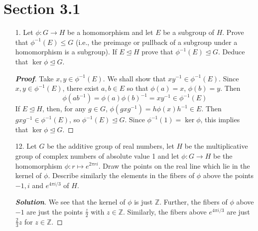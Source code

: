 \documentclass[12pt,leqno]{book}
\theoremstyle{definition}
\newcommand{\Z}{\mathbb{Z}}
\newenvironment{Proof}{\begin{proof}[\textnormal{\textbf{Proof}}]}{\end{proof}}
\newenvironment{Solution}{\begin{proof}[\textnormal{\textbf{Solution}}]}{\end{proof}}
\begin{document}
\section*{Section 3.1}
\begin{enumerate}
 \item [1.] Let $\phi:G\to H$ be a homomorphism and let $E$ be a subgroup of $H$. Prove that $\phi^{-1}(E)\leq G$ (i.e., the preimage or pullback of a subgroup under a homomorphism is a subgroup). If $E\unlhd H$ prove that $\phi^{-1}(E)\unlhd G$. Deduce that $\ker\phi\unlhd G$. 
\begin{Proof}
 Take $x,y\in\phi^{-1}(E)$. We shall show that $xy^{-1}\in\phi^{-1}(E)$. Since $x,y\in\phi^{-1}(E)$, there exist $a,b\in E$ so that $\phi(a)=x$, $\phi(b)=y$. Then \[\phi(ab^{-1})=\phi(a)\phi(b)^{-1}=xy^{-1}\in\phi^{-1}(E)\] If $E\unlhd H$, then, for any $g\in G$, $\phi(gxg^{-1})=h\phi(x)h^{-1}\in E$. Then $gxg^{-1}\in\phi^{-1}(E)$, so $\phi^{-1}(E)\unlhd G$. Since $\phi^{-1}(1)=\ker\phi$, this implies that $\ker\phi\unlhd G$.
\end{Proof}

 \item [12.] Let $G$ be the additive group of real numbers, let $H$ be the multiplicative group of complex numbers of absolute value 1 and let $\phi:G\to H$ be the homomorphism $\phi:r\mapsto e^{2\pi ri}$. Draw the points on the real line which lie in the kernel of $\phi$. Describe similarly the elements in the fibers of $\phi$ above the points $-1,i$  and $e^{4\pi i/3}$ of $H$.

\begin{Solution}
 We see that the kernel of $\phi$ is just $\Z$. Further, the fibers of $\phi$ above $-1$ are just the points $\frac{z}{2}$ with $z\in\Z$. Similarly, the fibers above $e^{4\pi i/3}$ are just $\frac{2}{3}z$ for $z\in\Z$. 
\end{Solution}


\end{enumerate}
\end{document}
